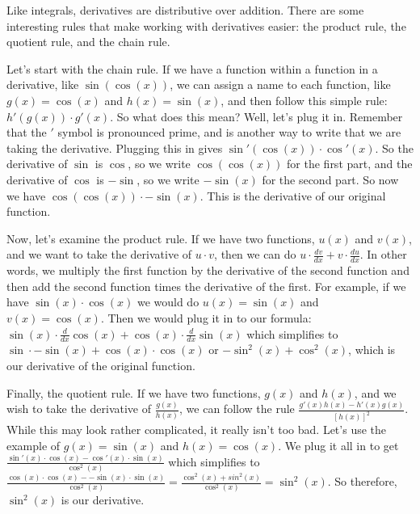 Like integrals, derivatives are distributive over addition.
There are some interesting rules that make working with derivatives easier: the product rule, the quotient rule, and the chain rule. 

Let's start with the chain rule. 
If we have a function within a function in a derivative, like $\sin(\cos(x))$, we can assign a name to each function, like $g(x) = \cos(x)$ and $h(x) = \sin(x)$, and then follow this simple rule: $h'(g(x)) \cdot g'(x)$. 
So what does this mean? 
Well, let's plug it in. 
Remember that the $'$ symbol is pronounced prime, and is another way to write that we are taking the derivative. 
Plugging this in gives $\sin'(\cos(x)) \cdot \cos'(x)$. 
So the derivative of $\sin$ is $\cos$, so we write $\cos(\cos(x))$ for the first part, and the derivative of $\cos$ is $-\sin$, so we write $-\sin(x)$ for the second part. 
So now we have $\cos(\cos(x)) \cdot -\sin(x)$. 
This is the derivative of our original function.

Now, let's examine the product rule. 
If we have two functions, $u(x)$ and $v(x)$, and we want to take the derivative of $u\cdot v$, then we can do $u \cdot \frac{dv}{dx}+ v\cdot\frac{du}{dx}$. 
In other words, we multiply the first function by the derivative of the second function and then add the second function times the derivative of the first. 
For example, if we have $\sin(x)\cdot\cos(x)$ we would do $u(x) = \sin(x)$ and $v(x) = \cos(x)$. 
Then we would plug it in to our formula: $\sin(x)\cdot\frac{d}{dx}\cos(x) + \cos(x)\cdot\frac{d}{dx}\sin(x)$ which simplifies to $\sin\cdot -\sin(x) + \cos(x)\cdot\cos(x)$ or $-\sin^2(x)+\cos^2(x)$, which is our derivative of the original function.

Finally, the quotient rule. 
If we have two functions, $g(x)$ and $h(x)$, and we wish to take the derivative of $\frac{g(x)}{h(x)}$, we can follow the rule $\frac{g'(x)h(x)-h'(x)g(x)}{[h(x)]^2}$. 
While this may look rather complicated, it really isn't too bad. 
Let's use the example of $g(x) = \sin(x)$ and $h(x) = \cos(x)$. 
We plug it all in to get $\frac{\sin'(x)\cdot\cos(x) -\cos'(x)\cdot\sin(x)}{\cos^2(x)}$
which simplifies to $\frac{\cos(x)\cdot\cos(x)--\sin(x)\cdot\sin(x)}{\cos^2(x)} = \frac{\cos^2(x)+sin^2(x)}{\cos^2(x)} = \sin^2(x)$. 
So therefore, $\sin^2(x)$ is our derivative.
